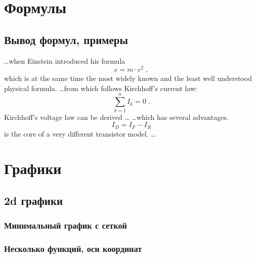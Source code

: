 \documentclass[oneside,final,14pt]{extreport}
\begin{document}
\section{Формулы}

\subsection{Вывод формул, примеры}

\ldots when Einstein introduced his formula
\begin{equation}
	e = m \cdot c^2 \; ,
\end{equation}
which is at the same time the most widely known
and the least well understood physical formula.
\ldots from which follows Kirchhoff's current law:
\begin{equation}
	\sum_{k=1}^{n} I_k = 0 \; .
\end{equation}
Kirchhoff's voltage law can be derived \ldots
\ldots which has several advantages.
\begin{equation}
	I_D = I_F - I_R
\end{equation}
is the core of a very different transistor model. \ldots

\section{Графики}

\subsection{2d графики}

\subsubsection{Минимальный график с сеткой}


\subsubsection{Несколько функций, оси координат}

\end{document}
